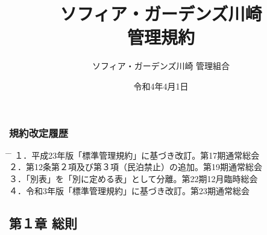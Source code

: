 \documentclass[
  luatex,
  paper=a4paper,
  fontsize=11pt,
  jafontsize=10pt,
  jlreq_notes,
]{jlreq}
\begin{document}
  \begin{titlepage}
    \pagestyle{empty} %
    \title{ソフィア・ガーデンズ川崎\\管理規約}
    \date{令和4年4月1日}
    \maketitle
    \begin{center}
      \vspace{160mm}
      \author{\Large ソフィア・ガーデンズ川崎 管理組合}
    \end{center}
    \vspace{\baselineskip}
    \vspace{\baselineskip}
    \subsubsection*{ 規約改定履歴 }
    \vspace{\baselineskip}
    \begin{tabbing}
      \hspace{5mm} \= \hspace{80mm} \= \hspace{100mm} \kill
      １．\>平成23年版「標準管理規約」に基づき改訂。\>第17期通常総会\\
      ２．\>第12条第２項及び第３項（民泊禁止）の追加。\>第19期通常総会\\
      ３．\>「別表」を「別に定める表」として分離。\>第22期12月臨時総会\\
      ４．\>令和3年版「標準管理規約」に基づき改訂。\>第23期通常総会\\
    \end{tabbing}
  \end{titlepage}
  \clearpage

  \tableofcontents       %
  \clearpage

  \setcounter{page}{1}    %
  \pagestyle{plain}       %

  \begin{center}
    \subsection*{第１章 総則}
  \end{center}
\end{document}
